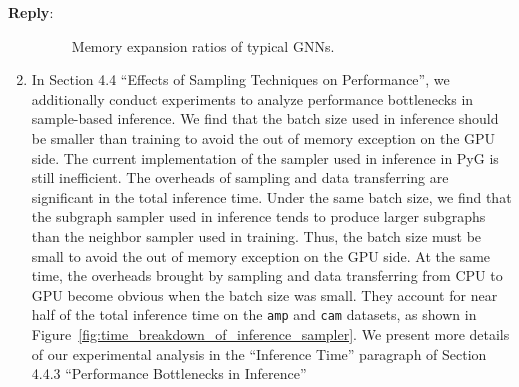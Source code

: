 \documentclass[12pt]{article}
\newenvironment{reply}
   {\medskip \noindent \textbf{Reply}:\  }
   {\medskip}
\begin{document}
\begin{reply}
\begin{enumerate}
    \begin{figure}[h]
        \caption{Memory expansion ratios of typical GNNs.}
        \label{fig:compare_memory_expasion_ratio}
    \end{figure}
    
    \item In Section 4.4 ``Effects of Sampling Techniques on Performance'', we additionally conduct experiments to analyze performance bottlenecks in sample-based inference.
    We find that the batch size used in inference should be smaller than training to avoid the out of memory exception on the GPU side.
    The current implementation of the sampler used in inference in PyG is still inefficient.
    The overheads of sampling and data transferring are significant in the total inference time.
    Under the same batch size, we find that the subgraph sampler used in inference tends to produce larger subgraphs than the neighbor sampler used in training.
    Thus, the batch size must be small to avoid the out of memory exception on the GPU side.
    At the same time, the overheads brought by sampling and data transferring from CPU to GPU become obvious when the batch size was small.
    They account for near half of the total inference time on the \texttt{amp} and \texttt{cam} datasets, as shown in Figure~\ref{fig:time_breakdown_of_inference_sampler}.
    We present more details of our experimental analysis in the ``Inference Time'' paragraph of Section 4.4.3 ``Performance Bottlenecks in Inference''
    

\end{enumerate}
\end{reply}
\end{document}

